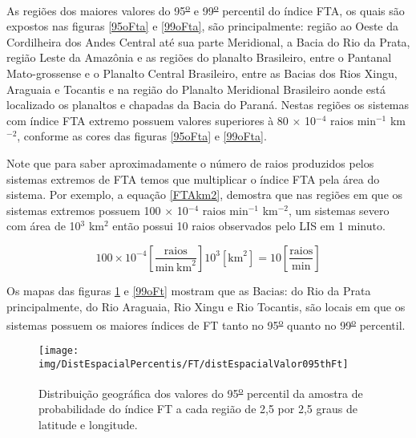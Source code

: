 As regiões dos maiores valores do 95\textsuperscript{\underline{o}} e 99\textsuperscript{\underline{o}} percentil do índice FTA, os quais são expostos nas figuras \ref{95oFta} e \ref{99oFta}, são principalmente:  região ao Oeste da Cordilheira dos Andes Central até sua parte Meridional, a Bacia do Rio da Prata, região Leste da Amazônia e as regiões do planalto Brasileiro, entre o Pantanal Mato-grossense e o Planalto Central Brasileiro, entre as Bacias dos Rios Xingu, Araguaia e Tocantis e na região do Planalto Meridional Brasileiro aonde está localizado os planaltos e chapadas da Bacia do Paraná. Nestas regiões os sistemas com índice FTA extremo possuem valores superiores à 80 $\times$ 10$^{-4}$ raios min$^{-1}$ km$^{-2}$, conforme as cores das figuras \ref{95oFta} e \ref{99oFta}. 


Note que para saber aproximadamente o número de raios produzidos pelos sistemas extremos de FTA temos que multiplicar o índice FTA pela área do sistema. Por exemplo, a equação \ref{FTAkm2}, demostra que nas regiões em que os sistemas extremos possuem 100 $\times$ 10$^{-4}$ raios min$^{-1}$ km$^{-2}$, um sistemas severo com área de 10$^3$ km$^2$ então possui 10 raios observados pelo LIS em 1 minuto.  

\begin{equation}
100 \times 10^{-4} \left[ \frac{\mathrm{raios}}{\mathrm{min}~\mathrm{km}^2} \right]  10^3 [ \mathrm{km}^2 ] = 10 \left[ \frac{\mathrm{raios}}{\mathrm{min}}\right]  
\label{FTAkm2}
\end{equation}

Os mapas das figuras \ref{95oFt} e \ref{99oFt} mostram que as Bacias: do Rio da Prata principalmente, do Rio Araguaia, Rio Xingu e Rio Tocantis, são locais em que os sistemas possuem os maiores índices de FT tanto no 95\textsuperscript{\underline{o}} quanto no 99\textsuperscript{\underline{o}} percentil.

\begin{figure}[!ht]
\centering
{\texttt{[image: img/DistEspacialPercentis/FT/distEspacialValor095thFt]}} 
\caption{Distribuição geográfica dos valores do 95\textsuperscript{\underline{o}} percentil da amostra de probabilidade do índice FT a cada região de 2,5 por 2,5 graus de latitude e longitude.}
\label{95oFt}
\end{figure} 
  
